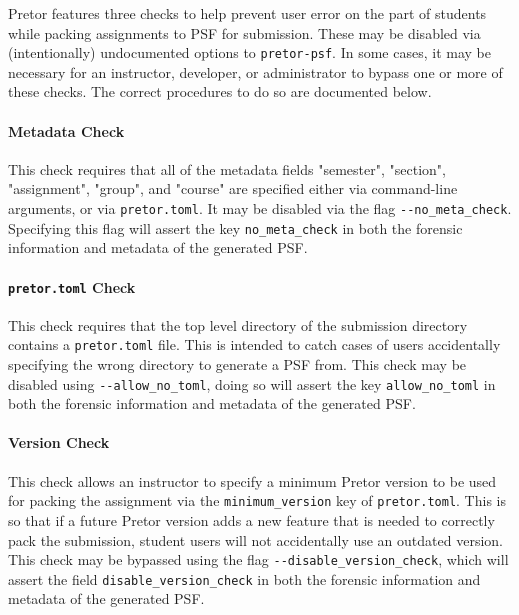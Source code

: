\documentclass{book}
\begin{document}


Pretor features three checks to help prevent user error on the part of students
while packing assignments to PSF for submission. These may be disabled via
(intentionally) undocumented options to \texttt{pretor-psf}. In some cases, it
may be necessary for an instructor, developer, or administrator to bypass one
or more of these checks. The correct procedures to do so are documented below.

\paragraph{Metadata Check} This check requires that all of the metadata fields
"semester", "section", "assignment", "group", and "course" are specified either
via command-line arguments, or via \texttt{pretor.toml}. It may be disabled via
the flag \texttt{-{}-no\_meta\_check}. Specifying this flag will assert the key
\texttt{no\_meta\_check} in both the forensic information and metadata of the
generated PSF.

\paragraph{\texttt{pretor.toml} Check} This check requires that the top level
directory of the submission directory contains a \texttt{pretor.toml} file.
This is intended to catch cases of users accidentally specifying the wrong
directory to generate a PSF from. This check may be disabled using
\texttt{-{}-allow\_no\_toml}, doing so will assert the key
\texttt{allow\_no\_toml} in both the forensic information and metadata of the
generated PSF.

\paragraph{Version Check} This check allows an instructor to specify a minimum
Pretor version to be used for packing the assignment via the
\texttt{minimum\_version} key of \texttt{pretor.toml}. This is so that if a
future Pretor version adds a new feature that is needed to correctly pack the
submission, student users will not accidentally use an outdated version.  This
check may be bypassed using the flag \texttt{-{}-disable\_version\_check},
which will assert the field \texttt{disable\_version\_check} in both the
forensic information and metadata of the generated PSF.
\end{document}
